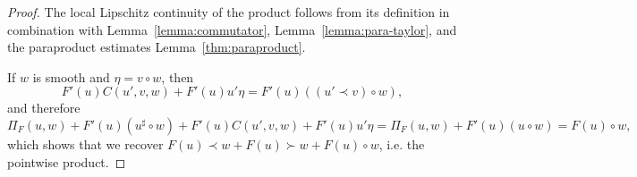 \documentclass[11pt,a4paper]{article}
\newcommand{\cdummy}{\cdot}
\theoremstyle{remark}
\begin{document}
\begin{proof}
  The local Lipschitz continuity of the product follows from its definition in
  combination with Lemma~\ref{lemma:commutator},
  Lemma~\ref{lemma:para-taylor}, and the paraproduct estimates
  Lemma~\ref{thm:paraproduct}. %
 
  If $w$ is smooth and $\eta = v \circ w$, then
  \[
     F'(u) C(u', v, w) + F'(u) u' \eta = F'(u) ((u'\prec v) \circ w),
  \]
  and therefore
  \[
     \Pi_{F} ( u,w ) +F' ( u ) ( u^{\sharp} \circ w ) +F' ( u ) C ( u' ,v,w ) +F' ( u ) u' \eta = \Pi_{F} ( u,w ) +F' ( u ) ( u \circ w ) =F ( u ) \circ w,
  \]
  which shows that we recover $F(u) \prec w + F(u) \succ w + F(u) \circ w$, i.e. the pointwise product.
  

\end{proof}
\end{document}
